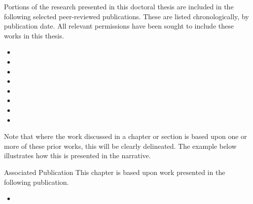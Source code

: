 
\begin{preamble}
Portions of the research presented in this doctoral thesis are included in the following selected peer-reviewed publications. These are listed chronologically, by publication date. All relevant permissions have been sought to include these works in this thesis.

\begin{itemize}
    \item{}
    \item{}
    \item{}
    \item{}
    \item{}
    \item{}
    \item{}
    \item{}
\end{itemize}

Note that where the work discussed in a chapter or section is based upon one or more of these prior works, this will be clearly delineated. The example below illustrates how this is presented in the narrative.

\vspace*{5mm}
\begin{publications_box}{Associated Publication}
This chapter is based upon work presented in the following publication.
\vspace*{-3mm}
\begin{itemize}
    \item{}
\end{itemize}
\end{publications_box}

\end{preamble}